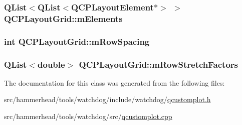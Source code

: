 \subsubsection[{\texorpdfstring{m\+Elements}{mElements}}]{\setlength{\rightskip}{0pt plus 5cm}Q\+List$<$Q\+List$<${\bf Q\+C\+P\+Layout\+Element}$\ast$$>$ $>$ Q\+C\+P\+Layout\+Grid\+::m\+Elements\hspace{0.3cm}{\ttfamily [protected]}}\hypertarget{classQCPLayoutGrid_a3577d3855bf8ad20ef9079291a49f397}{}\label{classQCPLayoutGrid_a3577d3855bf8ad20ef9079291a49f397}
\subsubsection[{\texorpdfstring{m\+Row\+Spacing}{mRowSpacing}}]{\setlength{\rightskip}{0pt plus 5cm}int Q\+C\+P\+Layout\+Grid\+::m\+Row\+Spacing\hspace{0.3cm}{\ttfamily [protected]}}\hypertarget{classQCPLayoutGrid_a8b67f183f4645739cc4c794d75843b40}{}\label{classQCPLayoutGrid_a8b67f183f4645739cc4c794d75843b40}
\subsubsection[{\texorpdfstring{m\+Row\+Stretch\+Factors}{mRowStretchFactors}}]{\setlength{\rightskip}{0pt plus 5cm}Q\+List$<$double$>$ Q\+C\+P\+Layout\+Grid\+::m\+Row\+Stretch\+Factors\hspace{0.3cm}{\ttfamily [protected]}}\hypertarget{classQCPLayoutGrid_a36c85a7eaf342680fb9b8a4977486f16}{}\label{classQCPLayoutGrid_a36c85a7eaf342680fb9b8a4977486f16}


The documentation for this class was generated from the following files\+:\begin{DoxyCompactItemize}
\item 
src/hammerhead/tools/watchdog/include/watchdog/\hyperlink{qcustomplot_8h}{qcustomplot.\+h}\item 
src/hammerhead/tools/watchdog/src/\hyperlink{qcustomplot_8cpp}{qcustomplot.\+cpp}\end{DoxyCompactItemize}
